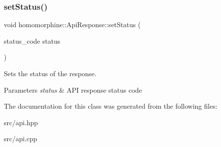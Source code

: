 \subsubsection{\texorpdfstring{set\+Status()}{setStatus()}}
{\footnotesize\ttfamily void homomorphine\+::\+Api\+Response\+::set\+Status (\begin{DoxyParamCaption}\item[{status\+\_\+code}]{status }\end{DoxyParamCaption})}

Sets the status of the response.


\begin{DoxyParams}{Parameters}
{\em status} & A\+PI response status code \\
\hline
\end{DoxyParams}


The documentation for this class was generated from the following files\+:\begin{DoxyCompactItemize}
\item 
src/api.\+hpp\item 
src/api.\+cpp\end{DoxyCompactItemize}
